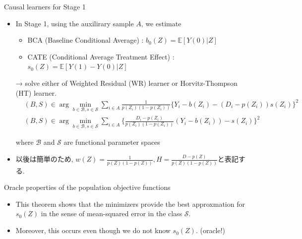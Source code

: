 \documentclass[xcolor=svgnames,aspectratio=169]{beamer}
\newcommand{\E}{\mathbb{E}}
\begin{document}
\begin{frame}{Causal learners for Stage 1}
    \begin{itemize}
        \item In Stage 1, using the auxilirary sample $A$, we estimate 
        \begin{itemize}
            \item BCA (Baseline Conditional Average) : $b_0(Z)=\E[Y(0)|Z]$
            \item CATE (Conditional Average Treatment Effect) : $s_0(Z)=\E[Y(1)-Y(0)|Z]$
        \end{itemize}
        → solve \alert{either} of Weighted Residual (WR) learner or Horvitz-Thompson (HT) learner.
        \begin{align*}
            &(B,S)\in \arg\min_{b\in\mathcal{B} , s\in\mathcal{S} }\sum_{i\in A} \frac{1}{p(Z_i)(1-p(Z_i))}\{Y_i-b(Z_i)-(D_i-p(Z_i))s(Z_i)\}^2 \\
            &(B,S)\in \arg\min_{b\in\mathcal{B} , s\in\mathcal{S} }\sum_{i\in A} \{\frac{D_i-p(Z_i)}{p(Z_i)(1-p(Z_i))}(Y_i-b(Z_i))-s(Z_i)\}^2 
        \end{align*}
        \begin{center}
            where $\mathcal{B}$ and $\mathcal{S}$ are functional parameter spaces
        \end{center}
        \item 以後は簡単のため, $w(Z)=\frac{1}{p(Z)(1-p(Z))},H=\frac{D-p(Z)}{p(Z)(1-p(Z))}$と表記する.
    \end{itemize}
\end{frame}

\begin{frame}{Oracle properties of the population objective functions}
    \begin{itemize}
        \begin{tcolorbox}[colframe=Cyan,title=Theorem 4]
        \begin{itemize}
            \item Suppose $Y, b(Z), s(Z), w(Z) \in L^2$ (2乗可積分).
            \item Then, the expectation of the loss functions can be decomposed 
            \begin{align*}
                &\E[w(Z)\{Y-b(Z)-(D-p(Z))s(Z)\}^2]=\E[(s_0(Z)-s(Z))^2]+C_{ib} \\
                &\E[(H(Y-b(Z)-s(Z)))^2]=\E[(s_0(Z)-s(Z))^2]+C_{2b}
            \end{align*}
            where $C_{1b}=\E[w(Z)(\tilde{b}_0(Z)-b(Z))^2]+C_1, C_{1b}=\E[w(Z)(\bar{b}_0(Z)-b(Z))^2]+C_2$
        \end{itemize}
    \end{tcolorbox}
    \item This theorem shows that the minimizers provide the best approxmation for $s_0(Z)$ in the sense of mean-squared error in the class $\mathcal{S} $.
    \item Moreover, this occurs even though we do not know $s_0(Z)$. (oracle!)
    \end{itemize}
\end{frame}
\end{document}
